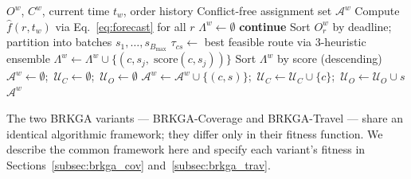 \documentclass[runningheads]{llncs}
\begin{document}
\begin{algorithm}[ht]
\caption{Business Model Lookahead — window $w$}
\label{alg:maxcover}
\begin{algorithmic}[1]
\Require $O^w$, $C^w$, current time $t_w$, order history
\Ensure Conflict-free assignment set $\mathcal{A}^w$
\State Compute $\hat{f}(r, t_w)$ via Eq.~\eqref{eq:forecast} for all $r$
\State $\Lambda^w \leftarrow \emptyset$
     
        \State \textbf{continue}
    \EndIf {}
    \State Sort $O^w_r$ by deadline; partition into batches $s_1,\ldots,s_{B_{\max}}$
        \State $\tau_{cs} \leftarrow$ best feasible route via 3-heuristic ensemble
            \State $\Lambda^w \leftarrow \Lambda^w \cup \{(c, s_j,\;\text{score}(c,s_j))\}$
        \EndIf
    \EndFor
\EndFor 
\State Sort $\Lambda^w$ by score (descending)
\State $\mathcal{A}^w \leftarrow \emptyset$;\ $\mathcal{U}_C \leftarrow \emptyset$;\ $\mathcal{U}_O \leftarrow \emptyset$
        \State $\mathcal{A}^w \leftarrow \mathcal{A}^w \cup \{(c,s)\}$;\ $\mathcal{U}_C \leftarrow \mathcal{U}_C \cup \{c\}$;\ $\mathcal{U}_O \leftarrow \mathcal{U}_O \cup s$
    \EndIf
\EndFor
\State \Return $\mathcal{A}^w$
\end{algorithmic}
\end{algorithm}


\label{subsec:brkga_framework}

The two BRKGA variants — BRKGA-Coverage and BRKGA-Travel — share an identical algorithmic framework; they differ only in their fitness function. We describe the common framework here and specify each variant's fitness in Sections~\ref{subsec:brkga_cov} and~\ref{subsec:brkga_trav}.
\end{document}
